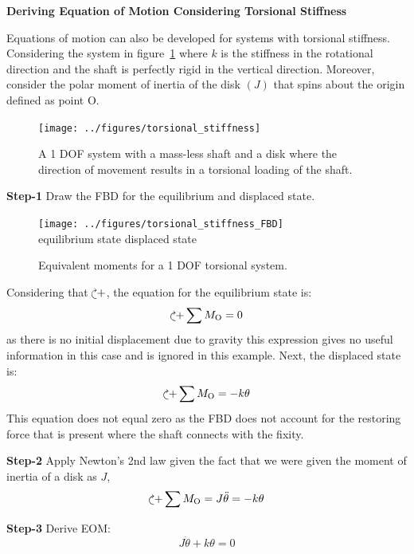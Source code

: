 \documentclass[12pt,letter]{article}
\begin{document}
		\begin{example}	
			\textbf{Deriving Equation of Motion Considering Torsional Stiffness}

			\noindent Equations of motion can also be developed for systems with torsional stiffness. Considering the system in figure~\ref{fig:torsional_stiffness} where $k$ is the stiffness in the rotational direction and the shaft is perfectly rigid in the vertical direction. Moreover, consider the polar moment of inertia of the disk $(J)$ that spins about the origin defined as point O.
			\begin{figure}[H]
				\centering
				\texttt{[image: ../figures/torsional\_stiffness]}
				\caption{A 1 DOF system with a mass-less shaft and a disk where the direction of movement results in a torsional loading of the shaft.}
				\label{fig:torsional_stiffness}
			\end{figure}	
	
			\noindent \textbf{Step-1}
			Draw the FBD for the equilibrium and displaced state.  
			\begin{figure}[H]
				\centering
				\texttt{[image: ../figures/torsional\_stiffness\_FBD]}\\\vspace{0.1cm}
				equilibrium state \hspace{3.6cm} displaced state
				\caption{Equivalent moments for a 1 DOF torsional system.}
			\end{figure}		
			\noindent Considering that $\curveplusclock$, the equation for the equilibrium state is:
			\begin{equation}
				\curveplusclock \sum M_\text{O} =  0
			\end{equation}
			as there is no initial displacement due to gravity this expression gives no useful information in this case and is ignored in this example. Next, the displaced state is:
			\begin{equation}
				\curveplusclock \sum M_\text{O} =  -k \theta
			\end{equation}	
			This equation does not equal zero as the FBD does not account for the restoring force that is present where the shaft connects with the fixity.	

			\noindent \textbf{Step-2} Apply Newton's 2nd law given the fact that we were given the moment of inertia of a disk as $J$,
			\begin{equation}
				\curveplusclock \sum M_\text{O} = J \ddot{\theta} =  -k \theta
			\end{equation}
			
			\noindent \textbf{Step-3} Derive EOM:
			\begin{equation}
				J \ddot{\theta} + k\theta  =0
			\end{equation}	
		\end{example}		






	
\end{document}

